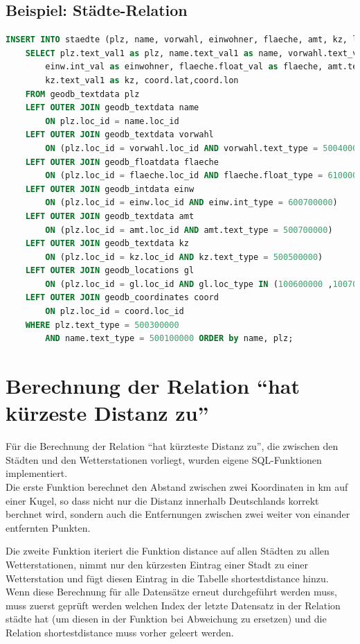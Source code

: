 \documentclass[11pt,a4paper,DIV=10,]{scrartcl}
\begin{document}
\subsection*{Beispiel: Städte-Relation}
\begin{lstlisting}[language=sql]
INSERT INTO staedte (plz, name, vorwahl, einwohner, flaeche, amt, kz, lat, lon)
	SELECT plz.text_val1 as plz, name.text_val1 as name, vorwahl.text_val1 as vorwahl,
		einw.int_val as einwohner, flaeche.float_val as flaeche, amt.text_val1 as amt,
		kz.text_val1 as kz, coord.lat,coord.lon
	FROM geodb_textdata plz
	LEFT OUTER JOIN geodb_textdata name 
		ON plz.loc_id = name.loc_id
	LEFT OUTER JOIN geodb_textdata vorwahl 
		ON (plz.loc_id = vorwahl.loc_id AND vorwahl.text_type = 500400000)
	LEFT OUTER JOIN geodb_floatdata flaeche 
		ON (plz.loc_id = flaeche.loc_id AND flaeche.float_type = 610000000)
	LEFT OUTER JOIN geodb_intdata einw 
		ON (plz.loc_id = einw.loc_id AND einw.int_type = 600700000)
	LEFT OUTER JOIN geodb_textdata amt 
		ON (plz.loc_id = amt.loc_id AND amt.text_type = 500700000)
	LEFT OUTER JOIN geodb_textdata kz 
		ON (plz.loc_id = kz.loc_id AND kz.text_type = 500500000)
	LEFT OUTER JOIN geodb_locations gl 
		ON (plz.loc_id = gl.loc_id AND gl.loc_type IN (100600000 ,100700000))
	LEFT OUTER JOIN geodb_coordinates coord 
		ON plz.loc_id = coord.loc_id
	WHERE plz.text_type = 500300000
		AND name.text_type = 500100000 ORDER by name, plz;
\end{lstlisting}

\section{Berechnung der Relation ``hat kürzeste Distanz zu''}
Für die Berechnung der Relation ``hat kürzteste Distanz zu'', die zwischen den Städten und den Wetterstationen vorliegt, 
wurden eigene SQL-Funktionen implementiert.\\
Die erste Funktion berechnet den Abstand zwischen zwei Koordinaten in km auf einer Kugel, so dass nicht nur die Distanz innerhalb Deutschlands korrekt berchnet wird, sondern auch die Entfernungen zwischen zwei weiter von einander entfernten Punkten. 


Die zweite Funktion iteriert die Funktion distance auf allen Städten zu allen Wetterstationen, nimmt nur den kürzesten Eintrag einer Stadt zu einer Wetterstation und fügt diesen Eintrag in die Tabelle shortestdistance hinzu. Wenn diese Berechnung für alle Datensätze erneut durchgeführt werden muss, muss zuerst geprüft werden welchen Index der letzte Datensatz in der Relation städte hat (um diesen in der Funktion bei Abweichung zu ersetzen) und die Relation shortestdistance muss vorher geleert werden. 

\end{document}
